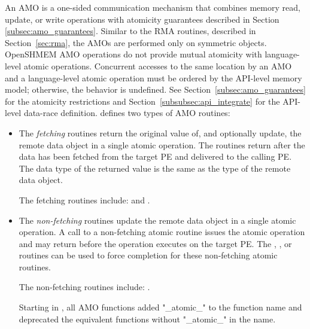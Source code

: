 An \ac{AMO} is a one-sided communication mechanism that combines memory read,
update, or write operations with atomicity guarantees described in Section~%
\ref{subsec:amo_guarantees}.  Similar to the \ac{RMA} routines, described in
Section~\ref{sec:rma}, the \acp{AMO} are performed only on symmetric objects.
OpenSHMEM \ac{AMO} operations do not provide mutual atomicity with
language-level atomic operations. Concurrent accesses to the same location by
an \openshmem \ac{AMO} and a language-level atomic operation must be ordered
by the API-level memory model; otherwise, the behavior is undefined. See
Section~\ref{subsec:amo_guarantees} for the atomicity restrictions and
Section~\ref{subsubsec:api_integrate} for the API-level data-race definition.
\openshmem defines two types of \ac{AMO} routines:

\begin{itemize}

\item
  The \emph{fetching} routines return the original value of, and optionally
  update, the remote data object in a single atomic operation.  The routines
  return after the data has been fetched from the target \ac{PE} and delivered
  to the calling \ac{PE}.
  The data type of the returned value is the same as the type of
  the remote data object.

  The fetching routines include:
   and
  .

\item
  The \emph{non-fetching} routines update the remote data object in a single
  atomic operation.  A call to a non-fetching atomic routine issues the atomic
  operation and may return before the operation executes on the target \ac{PE}.
  The , , or 
  routines can be used to force completion for these non-fetching
  atomic routines.

  The non-fetching routines include:
  .

\begin{DeprecateBlock}

Starting in \openshmem[1.4], all \ac{AMO} functions added "\_atomic\_" to the function 
name and deprecated the equivalent functions without "\_atomic\_" in the name.

\end{DeprecateBlock}

\end{itemize}

